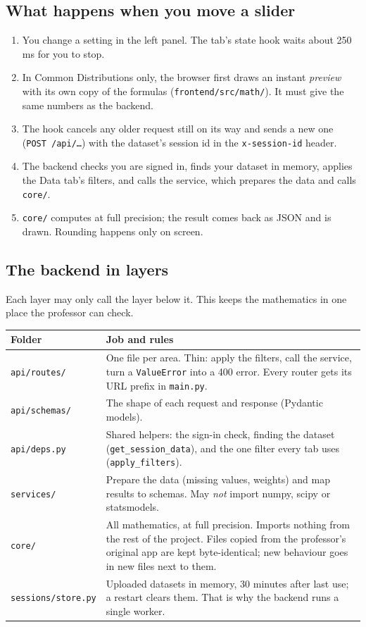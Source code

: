 \documentclass[11pt,a4paper]{article}
\newcommand{\f}[1]{\texttt{#1}}
\begin{document}
\subsection{What happens when you move a slider}
\begin{enumerate}
\item You change a setting in the left panel. The tab's state hook waits about 250 ms for you to stop.
\item In Common Distributions only, the browser first draws an instant \emph{preview} with its own copy of the
  formulas (\f{frontend/src/math/}). It must give the same numbers as the backend.
\item The hook cancels any older request still on its way and sends a new one (\f{POST /api/…}) with the
  dataset's session id in the \f{x-session-id} header.
\item The backend checks you are signed in, finds your dataset in memory, applies the Data tab's filters, and
  calls the service, which prepares the data and calls \f{core/}.
\item \f{core/} computes at full precision; the result comes back as JSON and is drawn. Rounding happens only
  on screen.
\end{enumerate}

\subsection{The backend in layers}
Each layer may only call the layer below it. This keeps the mathematics in one place the professor can check.
\begin{center}
\begin{tabularx}{\textwidth}{@{}>{\raggedright\arraybackslash}p{3.3cm}L@{}}
\toprule
\textbf{Folder} & \textbf{Job and rules} \\
\midrule
\f{api/routes/} & One file per area. Thin: apply the filters, call the service, turn a \f{ValueError} into a 400 error. Every router gets its URL prefix in \f{main.py}. \\
\f{api/schemas/} & The shape of each request and response (Pydantic models). \\
\f{api/deps.py} & Shared helpers: the sign-in check, finding the dataset (\f{get\_session\_data}), and the one filter every tab uses (\f{apply\_filters}). \\
\f{services/} & Prepare the data (missing values, weights) and map results to schemas. May \emph{not} import numpy, scipy or statsmodels. \\
\f{core/} & All mathematics, at full precision. Imports nothing from the rest of the project. Files copied from the professor's original app are kept byte-identical; new behaviour goes in new files next to them. \\
\f{sessions/store.py} & Uploaded datasets in memory, 30 minutes after last use; a restart clears them. That is why the backend runs a single worker. \\
\bottomrule
\end{tabularx}
\end{center}
\end{document}
